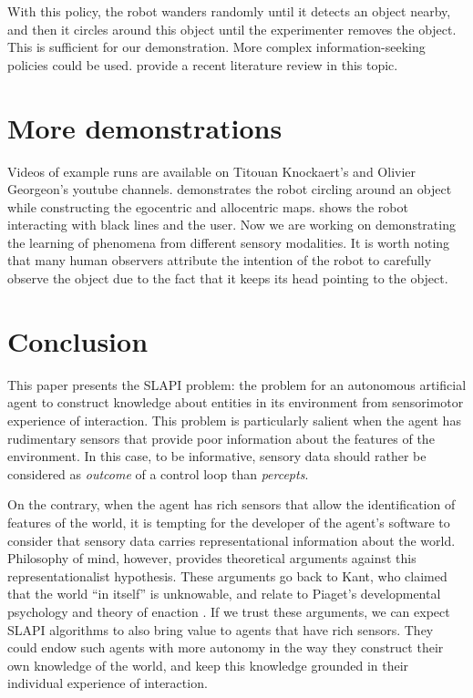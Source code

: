 \documentclass[pmlr]{jmlr}%
\begin{document}
With this policy, the robot wanders randomly until it detects an object nearby, and then it circles around this object until the experimenter removes the object. 
This is sufficient for our demonstration. 
More complex information-seeking policies could be used. 
\cite{gottlieb_towards_2018} provide a recent literature review in this topic. 


\section{More demonstrations}

Videos of example runs are available on Titouan Knockaert's and Olivier Georgeon's youtube channels.
\cite{knockaert_demonstration_2022} demonstrates the robot circling around an object while constructing the egocentric and allocentric maps. 
\cite{georgeon_demontration_2021} shows the robot interacting with black lines and the user.
Now we are working on demonstrating the learning of phenomena from different sensory modalities. 
It is worth noting that many human observers attribute the intention of the robot to carefully observe the object due to the fact that it keeps its head pointing to the object. 


\section{Conclusion}

This paper presents the SLAPI problem: the problem for an autonomous artificial agent to construct knowledge about entities in its environment from sensorimotor experience of interaction.  
This problem is particularly salient when the agent has rudimentary sensors that provide poor information about the features of the environment. 
In this case, to be informative, sensory data should rather be considered as \textit{outcome} of a control loop than \textit{percepts}.

On the contrary, when the agent has rich sensors that allow the identification of features of the world, it is tempting for the developer of the agent's software to consider that sensory data carries representational information about the world. 
Philosophy of mind, however, provides theoretical arguments against this representationalist hypothesis. 
These arguments go back to Kant, who claimed that the world ``in itself'' is unknowable, and relate to Piaget's developmental psychology and theory of enaction \citep[e.g.,][]{froese_enactive_2009}. 
If we trust these arguments, we can expect SLAPI algorithms to also bring value to agents that have rich sensors. 
They could endow such agents with more autonomy in the way they construct their own knowledge of the world, and keep this knowledge grounded in their individual experience of interaction.
\end{document}
